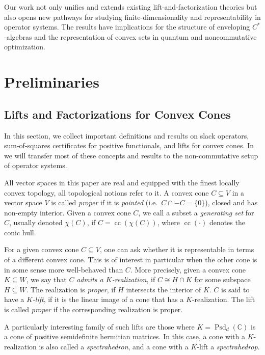 \documentclass[11pt,onecolumn]{article}
\theoremstyle{plain}
\theoremstyle{definition}
\begin{document}
Our work not only unifies and extends existing lift-and-factorization theories but also opens new pathways for studying finite-dimensionality and representability in operator systems. The results have implications for the structure of enveloping $C^*$-algebras and the representation of convex sets in quantum and noncommutative optimization.

\section{Preliminaries}

\subsection{Lifts and Factorizations for Convex Cones} \label{sec:lift_fact}

In this section, we collect  important definitions and results on  slack operators,  sum-of-squares certificates for positive functionals, and  lifts for convex cones.  In  we will transfer most of these concepts and results to the non-commutative setup of operator systems.

All vector spaces in this paper are real and equipped with the finest locally convex topology, all topological notions refer to it.
A convex cone \(C \subseteq V\) in a vector space \(V\) is called \textit{proper} if it is \textit{pointed} (i.e.\  $C \cap -C = \lbrace 0 \rbrace$), closed and has non-empty interior.
Given a convex cone \(C\), we call a subset a \textit{generating set} for \(C\), usually denoted \(\chi(C)\), if \(C = \operatorname{cc}(\chi(C))\), where \(\operatorname{cc}(\cdot)\) denotes the conic hull.

For a given convex cone \(C \subseteq V\), one can ask whether it is representable in terms of a different convex  cone. This is of interest in particular when the other cone is in some sense more well-behaved than \(C\). More precisely, given a convex cone $K\subseteq W$, we say that \(C\) {\it admits a $K$-realization}, if $C\cong H\cap K$ for some subspace $H\subseteq W$. The realization is {\it proper}, if $H$ intersects the interior of $K$. $C$ is said to have a \textit{\(K\)-lift}, if it is the linear image of a cone that has a $K$-realization.   The lift is called {\it proper} if the corresponding realization is proper.

A particularly interesting family of such lifts are those where  \(K = \operatorname{Psd}_d(\mathbb C)\) is a cone of positive semidefinite hermitian matrices. In this case, a cone with a $K$-realization is also called  a \textit{spectrahedron}, and a cone with a $K$-lift a \textit{spectrahedrop}.
\end{document}
